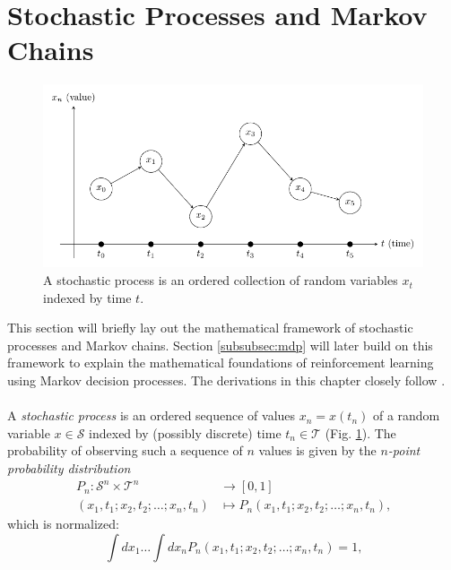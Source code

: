 \section{Stochastic Processes and Markov Chains}
\label{sec:stochastic-processes}
\begin{figure}[h]
    \centering
    \includegraphics[width=\textwidth]{stoch_proc.pdf}
    \caption{A stochastic process is an ordered collection of random variables $x_t$ indexed by time $t$.}
    \label{fig:stochastic-processes}
\end{figure}
This section will briefly lay out the mathematical framework of stochastic processes and Markov chains. Section \ref{subsubsec:mdp} will later build on this framework to explain the mathematical foundations of reinforcement learning using Markov decision processes. The derivations in this chapter closely follow \cite[chapter 2.2]{tauber_critical_2014}.
\\
\\
A \textit{stochastic process} is an ordered sequence of values $x_n=x(t_n)$ of a random variable $x\in\mathcal{S}$ indexed by (possibly discrete) time $t_n\in\mathcal{T}$ (Fig. \ref{fig:stochastic-processes}). The probability of observing such a sequence of $n$ values is given by the \textit{$n$-point probability distribution}
\begin{align}
    P_n: \mathcal{S}^n \times \mathcal{T}^n &\rightarrow [0,1] \\
    (x_1, t_1; x_2, t_2; \dots; x_n, t_n) &\mapsto P_n(x_1, t_1; x_2, t_2; \dots; x_n, t_n) \text{,}
    \label{eq:n-point-probability-distribution}
\end{align}
which is normalized:
\begin{equation}
    \int dx_1 \dots \int dx_n P_n(x_1, t_1; x_2, t_2; \dots; x_n, t_n) = 1 \text{,}
    \label{eq:n-point-probability-distribution-normalized}
\end{equation}

